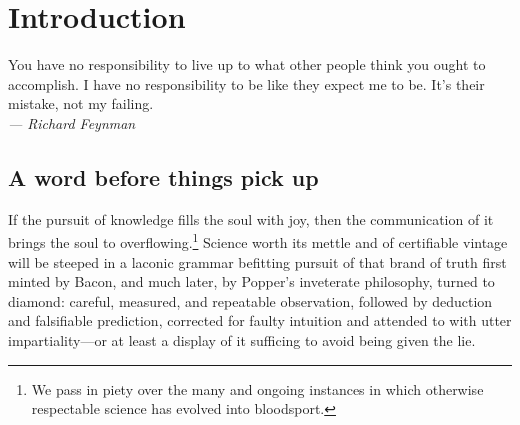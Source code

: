 
\chapter{Introduction}
\label{chp:1}

\begin{flushright}
  \begin{minipage}[]{0.5\linewidth}
    \begin{flushright}
      You have no responsibility to live up to what other people think you ought
      to accomplish. I have no responsibility to be like they expect me to
      be. It's their mistake, not my failing. \\{\small \emph{--- Richard Feynman} }
    \end{flushright}
  \end{minipage}
\end{flushright}
\vspace{\baselineskip}

\section{A word before things pick up}


If the pursuit of knowledge fills the soul with joy, then the
communication of it brings the soul to overflowing.\footnote{We pass
  in piety over the many and ongoing instances in which otherwise
  respectable science has evolved into bloodsport.} Science worth its
mettle and of certifiable vintage will be steeped in a laconic grammar
befitting pursuit of that brand of truth first minted by Bacon, and
much later, by Popper's inveterate philosophy, turned to diamond:
careful, measured, and repeatable observation, followed by deduction
and falsifiable prediction, corrected for faulty intuition and
attended to with utter impartiality---or at least a display of it
sufficing to avoid being given the lie.

